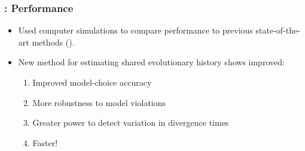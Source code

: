 \begin{frame}
    \frametitle{\dppmsbayes: Performance}
    \begin{itemize}
        \item<1-> Used computer simulations to compare performance to previous
            state-of-the-art methods (\msb).
        \item<2-> New method for estimating shared evolutionary history shows
            improved:
            \begin{enumerate}
                \item<2-> Improved model-choice accuracy 
                \item<2-> More robustness to model violations
                \item<2-> Greater power to detect variation in divergence times
                \item<2-> Faster!
            \end{enumerate}
    \end{itemize}

\end{frame}

